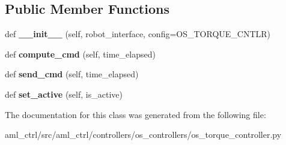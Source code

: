 \subsection*{Public Member Functions}
\begin{DoxyCompactItemize}
\item 
\hypertarget{classaml__ctrl_1_1controllers_1_1os__controllers_1_1os__torque__controller_1_1_o_s_torque_controller_a92f1001f2f39df3a0a4c12cc150e6a87}{}\label{classaml__ctrl_1_1controllers_1_1os__controllers_1_1os__torque__controller_1_1_o_s_torque_controller_a92f1001f2f39df3a0a4c12cc150e6a87} 
def {\bfseries \+\_\+\+\_\+init\+\_\+\+\_\+} (self, robot\+\_\+interface, config=O\+S\+\_\+\+T\+O\+R\+Q\+U\+E\+\_\+\+C\+N\+T\+LR)
\item 
\hypertarget{classaml__ctrl_1_1controllers_1_1os__controllers_1_1os__torque__controller_1_1_o_s_torque_controller_a9d0f9668b4acd2c1b75bd5c215e25aee}{}\label{classaml__ctrl_1_1controllers_1_1os__controllers_1_1os__torque__controller_1_1_o_s_torque_controller_a9d0f9668b4acd2c1b75bd5c215e25aee} 
def {\bfseries compute\+\_\+cmd} (self, time\+\_\+elapsed)
\item 
\hypertarget{classaml__ctrl_1_1controllers_1_1os__controllers_1_1os__torque__controller_1_1_o_s_torque_controller_a74e3fceb0fab4a0a57a9be568b9aee2c}{}\label{classaml__ctrl_1_1controllers_1_1os__controllers_1_1os__torque__controller_1_1_o_s_torque_controller_a74e3fceb0fab4a0a57a9be568b9aee2c} 
def {\bfseries send\+\_\+cmd} (self, time\+\_\+elapsed)
\item 
\hypertarget{classaml__ctrl_1_1controllers_1_1os__controllers_1_1os__torque__controller_1_1_o_s_torque_controller_a2aac9f67842306c0b1a2fb336cf05f14}{}\label{classaml__ctrl_1_1controllers_1_1os__controllers_1_1os__torque__controller_1_1_o_s_torque_controller_a2aac9f67842306c0b1a2fb336cf05f14} 
def {\bfseries set\+\_\+active} (self, is\+\_\+active)
\end{DoxyCompactItemize}


The documentation for this class was generated from the following file\+:\begin{DoxyCompactItemize}
\item 
aml\+\_\+ctrl/src/aml\+\_\+ctrl/controllers/os\+\_\+controllers/os\+\_\+torque\+\_\+controller.\+py\end{DoxyCompactItemize}
